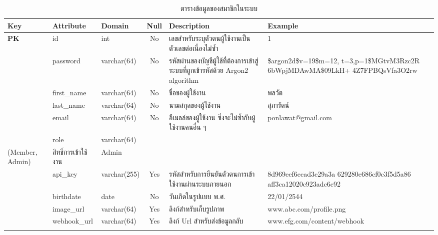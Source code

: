 \documentclass[12pt,oneside,openright,a4paper]{cpe-thai-project}
\begin{document}
\begin{itemize}
\begin{longtable}{p{}|p{}|p{}|m{}|p{}|p{}}
  \caption{ตารางข้อมูลของสมาชิกในระบบ}\label{tbl:users}  \\
  \hhline{======} 
  \textbf{Key} & \textbf{Attribute} & \textbf{Domain} & \multicolumn{1}{c|}{\textbf{Null}} & \textbf{Description} & \textbf{Example}   \\ \hline
  \endhead
  \textbf{PK}  & id  & int  & \multicolumn{1}{c|}{No}  & เลขสำหรับระบุตัวตนผู้ใช้งานเป็นตัวเลขต่อเนื่องไม่ซ้ำ & 1                  \\ \hline
  \textbf{} & password & varchar(64) & \multicolumn{1}{c|}{No} & รหัสผ่านของบัญชีผู้ใช้ที่ต้องการเข้าสู่ระบบที่ถูกเข้ารหัสด้วย Argon2 algorithm & \$argon2d\$v=19\$m=12, t=3,p=1\$MGtvM3Rzc2R 6bWpjMDAwMA\$09LkH+ 4Z7FPBQsVfa3O2rw \\ \hline
  \textbf{}   & first\_name        & varchar(64)     & \multicolumn{1}{c|}{No}                  & ชื่อของผู้ใช้งาน                                      & พลวัต              \\ \hline
  \textbf{}   & last\_name         & varchar(64)     & \multicolumn{1}{c|}{No}                  & นามสกุลของผู้ใช้งาน                                   & สุภารัตน์          \\ \hline
  \textbf{}   & email              & varchar(64)     & \multicolumn{1}{c|}{No}                  & อีเมลล์ของผู้ใช้งาน ซึ่งจะไม่ซ้ำกับผู้ใช้งานคนอื่น ๆ  & ponlawat@gmail.com \\ \hline
  \textbf{}   & role               & varchar(64)     & \begin{tabular}[c]{@{}c@{}} ENUM \\ (Member, Admin) \end{tabular} & สิทธิ์การเข้าใช้งาน                                   & Admin              \\ \hline
  \textbf{}   & api\_key & varchar(255) & \multicolumn{1}{c|}{Yes} &  รหัสสำหรับการยืนยันตัวตนการเข้าใช้งานผ่านระบบภายนอก & 8d969eef6ecad3c29a3a 629280e686cf0c3f5d5a86 aff3ca12020c923adc6c92 \\ \hline
  \textbf{}   & birthdate        & date     & \multicolumn{1}{c|}{No}                  & วันเกิดในรูปแบบ พ.ศ.                                      & 22/01/2544              \\ \hline
  \textbf{}   & image\_url        & varchar(64)     & \multicolumn{1}{c|}{Yes}          & ลิงก์สำหรับเก็บรูปภาพ                                     & www.abc.com/profile.png              \\ \hline
  \textbf{}   & webhook\_url        & varchar(64)     & \multicolumn{1}{c|}{Yes}          & ลิงก์ Url สำหรับส่งข้อมูลกลับ                           & www.efg.com/content/webhook            \\
  \hhline{======}  
\end{longtable}


\end{itemize}
\end{document}
